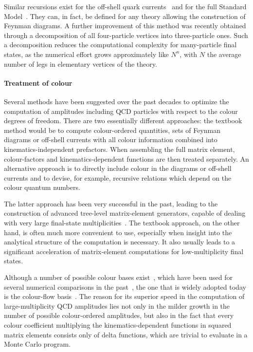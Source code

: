 Similar recursions exist for the off-shell quark currents~\cite{Berends:1987me} 
and for the full Standard Model~\cite{Gleisberg:2008fv}.  They can, in fact, 
be defined for any theory allowing the construction of Feynman diagrams.
A further improvement of this method was recently obtained through a 
decomposition of all four-particle vertices into three-particle ones.
Such a decomposition reduces the computational complexity for
many-particle final states, as the numerical effort grows approximately like 
$N^n$, with $N$ the average number of legs in elementary vertices of the theory.


\paragraph{Treatment of colour} 

Several methods have been suggested over the past decades to optimize the
computation of amplitudes including QCD particles with respect to the 
colour degrees of freedom.  There are two essentially different approaches:
the textbook method would be to compute colour-ordered quantities, \ie 
sets of Feynman diagrams or off-shell currents with all colour information 
combined into kinematics-independent prefactors.  When assembling the full 
matrix element, colour-factors and kinematics-dependent functions are then
treated separately.  An alternative approach is to directly include colour 
in the diagrams or off-shell currents and to devise, for example, recursive 
relations which depend on the colour quantum numbers.

The latter approach has been very successful in the past, leading to the 
construction of advanced tree-level matrix-element generators, capable of 
dealing with very large final-state multiplicities~\cite{Kanaki:2000ey, 
  Draggiotis:2002hm,Mangano:2002ea,Gleisberg:2008fv}.
The textbook approach, on the other hand, is often much more convenient to use,
especially when insight into the analytical structure of the computation is 
necessary.  It also usually leads to a significant acceleration of 
matrix-element computations for low-multiplicity final states.

Although a number of possible colour bases exist~\cite{Mangano:1987xk,
  DelDuca:1999ha,DelDuca:1999rs}, which have been used for
several numerical comparisons in the past~\cite{Duhr:2006iq}, the 
one that is widely adopted today is the colour-flow 
basis~\cite{Kanaki:2000ey,Maltoni:2002mq}. The reason for its superior 
speed in the computation of large-multiplicity QCD amplitudes lies not only 
in the milder growth in the number of possible colour-ordered amplitudes, but 
also in the fact that every colour coefficient multiplying the 
kinematics-dependent functions in squared matrix elements consists only 
of delta functions, which are trivial to evaluate in a Monte Carlo program.
